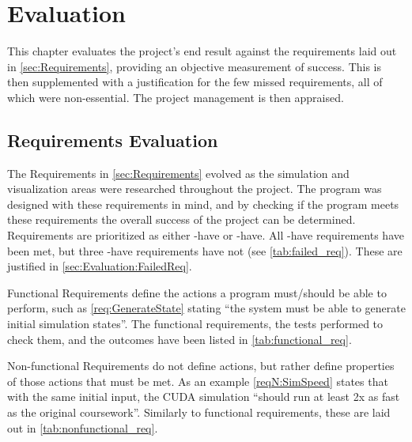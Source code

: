 
\chapter{Evaluation}\label{sec:Evaluation}

This chapter evaluates the project's end result against the requirements laid out in \cref{sec:Requirements}, providing an objective measurement of success.
This is then supplemented with a justification for the few missed requirements, all of which were non-essential.
The project management is then appraised.

\section{Requirements Evaluation}
The Requirements in \cref{sec:Requirements} evolved as the simulation and visualization areas were researched throughout the project.
The program was designed with these requirements in mind, and by checking if the program meets these requirements the overall success of the project can be determined.
Requirements are prioritized as either \must{}-have or \should{}-have.
All \must{}-have requirements have been met, but three \should{}-have requirements have not (see \cref{tab:failed_req}).
These are justified in \cref{sec:Evaluation:FailedReq}.

Functional Requirements define the actions a program must/should be able to perform, such as \cref{req:GenerateState} stating ``the system must be able to generate initial simulation states''.
The functional requirements, the tests performed to check them, and the outcomes have been listed in \cref{tab:functional_req}.

Non-functional Requirements do not define actions, but rather define properties of those actions that must be met.
As an example \cref{reqN:SimSpeed} states that with the same initial input, the CUDA simulation ``should run at least 2x as fast as the original coursework''.
Similarly to functional requirements, these are laid out in \cref{tab:nonfunctional_req}.

